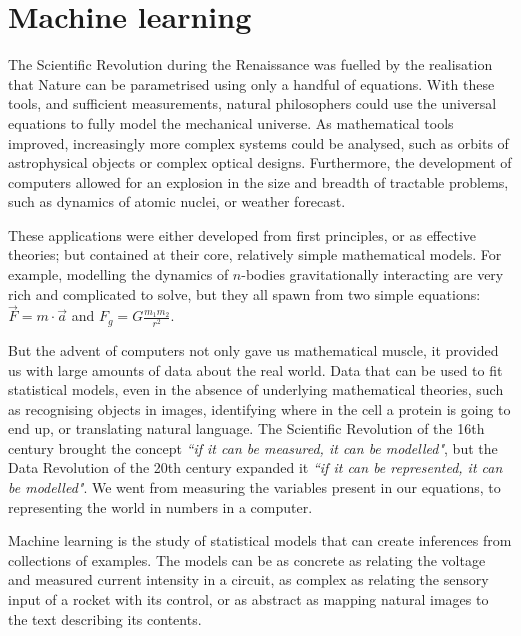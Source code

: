 \chapter{Machine learning}

The Scientific Revolution during the Renaissance 
was fuelled by the realisation that Nature can be parametrised using only a handful of equations.
With these tools, and sufficient measurements, natural philosophers could use the universal equations to fully model the mechanical universe.
As mathematical tools improved, increasingly more complex systems could be analysed, such as orbits of astrophysical objects or complex optical designs.
Furthermore, the development of computers allowed for an explosion in the size and breadth of tractable problems, such as dynamics of atomic nuclei, or weather forecast.

These applications were either developed from first principles, or as effective theories; but contained at their core, relatively simple mathematical models.
For example, modelling the dynamics of $n$-bodies gravitationally interacting are very rich and complicated to solve, but they all spawn from two simple equations: $\vec{F} = m \cdot \vec{a}$  and $F_g=G\frac{m_1  m_2}{r^2}$.

But the advent of computers not only gave us mathematical muscle, it provided us with large amounts of data about the real world.
Data that can be used to fit statistical models, even in the absence of underlying mathematical theories, such as recognising objects in images, identifying where in the cell a protein is going to end up, or translating natural language.
The Scientific Revolution of the 16th century brought the concept \emph{``if it can be measured, it can be modelled"}, but the Data Revolution of the 20th century expanded it \emph{``if it can be \emph{represented}, it can be modelled"}.
We went from measuring the variables present in our equations, to representing the world in numbers in a computer.


Machine learning 
is the study of statistical models that can create inferences from collections of examples. 
The models can be as concrete as relating the voltage and measured current intensity in a circuit, as complex as relating the sensory input of a rocket with its control, or as abstract as mapping natural images to the text describing its contents.

